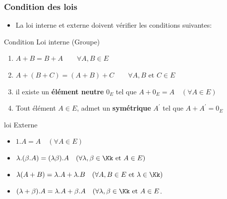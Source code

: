 \documentclass[dvipsnames]{beamer}
\begin{document}
\begin{frame}[<+->]
  \frametitle{Condition des lois}
  \begin{itemize}
    \small
    \item La loi interne et externe doivent vérifier les conditions
      suivantes:
  \end{itemize} 

  \begin{block}{Condition Loi interne (Groupe)}
 \begin{enumerate}
   \small
 \item  $A + B = B + A\quad\quad \forall A, B \in E$\\[4pt]
 \item $A+(B + C) = (A + B) + C\quad\quad \forall A,B \text{ et  } C\in E$\\[4pt]
 \item il existe un \textbf{\alert{élément neutre}} $0_E$ tel que $ A + 0_E
   = A\quad(\forall A\in E)$
 \item Tout élément  $A\in E$, admet un \textbf{\alert{symétrique}}
   $A^{'}$
   tel que $A + A^{'} = 0_E$
 \end{enumerate} 
\end{block}

\begin{block}{loi Externe}
  \begin{itemize}
    \item $1.A = A\quad (\forall A \in E)$
    \item $\lambda.(\beta.A)  = (\lambda\beta).A\quad(\forall \lambda, \beta
      \in \Kk \text{ et } A \in E)$
    \item $\lambda(A + B) = \lambda.A + \lambda.B\quad (\forall A,B
      \in E \text{ et } \lambda \in \Kk)$
    \item $(\lambda + \beta).A = \lambda.A + \beta.A \quad (\forall
      \lambda, \beta \in \Kk \text{ et } A\in E$.
  \end{itemize} 
\end{block}
\end{frame}
\end{document}
